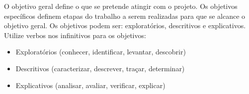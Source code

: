 O objetivo geral define o que se pretende atingir com o projeto.
Os objetivos específicos definem etapas do trabalho a serem realizadas para que se
alcance o objetivo geral. Os objetivos podem ser: exploratórios, descritivos e explicativos.
Utilize verbos nos infinitivos para os objetivos:

\begin{itemize}
    \item Exploratórios (conhecer, identificar, levantar, descobrir)
    \item Descritivos (caracterizar, descrever, traçar, determinar)
    \item Explicativos (analisar, avaliar, verificar, explicar)
\end{itemize}